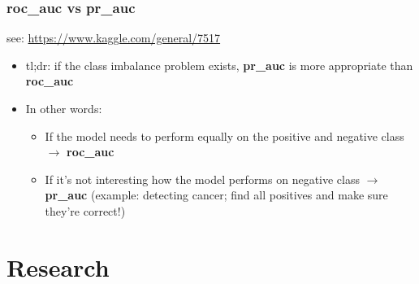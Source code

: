\documentclass[12pt,a4paper]{article}
\begin{document}
\subsubsection{roc\_auc vs pr\_auc}
see: \url{https://www.kaggle.com/general/7517}
\begin{itemize}
\item tl;dr: if the class imbalance problem exists, \textbf{pr\_auc} is more appropriate than \textbf{roc\_auc}
\item In other words: 
\begin{itemize}
\item If the model needs to perform equally on the positive and negative class $\rightarrow$ \textbf{roc\_auc}
\item If it's not interesting how the model performs on negative class $\rightarrow$ \textbf{pr\_auc} (example: detecting cancer; find all positives and make sure they're correct!)
\end{itemize}
\end{itemize}
%
\section{Research}
\end{document}
